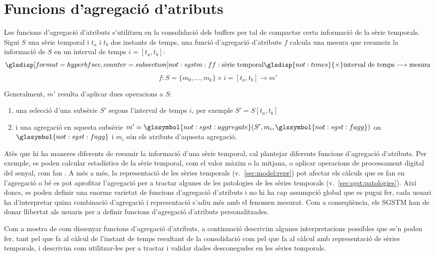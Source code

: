 
\section{Funcions d'agregació d'atributs}
\label{sec:model:interpolador}
\label{sec:model:agregador}


Les funcions d'agregació d'atributs s'utilitzen en la consolidació
dels buffers per tal de compactar certa informació de la sèrie
temporals. Sigui $S$ una sèrie temporal i $t_a$ i $t_b$ dos instants
de temps, una funció d'agregació d'atributs $f$ calcula una mesura que
resumeix la informació de $S$ en un interval de temps $i=[t_a,t_b]$:
\[
\glsdispsec{not:sgstm:f}{f}: \text{sèrie temporal} \glsdisp{not:times}{\times}
\text{interval de temps} \longrightarrow \text{mesura}
\]
\[
f: S=\{m_0,\dotsc,m_k\} \times i=[t_a,t_b] \longrightarrow  m'
\]


Generalment, $m'$ resulta d'aplicar dues operacions a $S$: 
\begin{enumerate}
\item una selecció d'una subsèrie $S'$ segons l'interval de temps $i$,
  per exemple $S' = S[t_a,t_b]$
\item i una agregació en aquesta subsèrie $m' =
  \glssymbol{not:sgst:aggregate}(S',m_i,\glssymbol{not:sgst:fagg})$ on
  $\glssymbol{not:sgst:fagg}$ i $m_i$ són els atributs d'aquesta agregació.
\end{enumerate}



Atès que hi ha maneres diferents de resumir la informació d'una sèrie
temporal, cal plantejar diferents funcions d'agregació d'atributs. Per
exemple, es poden calcular estadístics de la sèrie temporal, com el
valor màxim o la mitjana, o aplicar operacions de processament digital
del senyal, com fan \textcite{zhang11}. A més a més, la representació
de les sèries temporals (v.~\autoref{sec:model:repr}) pot afectar els
càlculs que es fan en l'agregació o bé es pot aprofitar l'agregació
per a tractar algunes de les patologies de les sèries temporals
(v.~\autoref{sec:sgst:patologies}).  Així doncs, es poden definir una
enorme varietat de funcions d'agregació d'atributs i no hi ha cap
assumpció global que es pugui fer, cada usuari ha d'interpretar quina
combinació d'agregació i representació s'adiu més amb el fenomen
mesurat. Com a conseqüència, els \gls{SGSTM} han de donar llibertat
als usuaris per a definir funcions d'agregació d'atributs
personalitzades.


Com a mostra de com dissenyar funcions d'agregació d'atributs, a
continuació descrivim algunes interpretacions possibles que se'n poden
fer, tant pel que fa al càlcul de l'instant de temps resultant de la
consolidació com pel que fa al càlcul amb representació de sèries
temporals, i descrivim com utilitzar-les per a tractar i validar dades
desconegudes en les sèries temporals.



